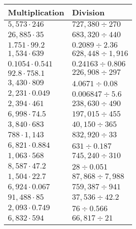 \begin{longtable}[]{@{}ll@{}}
\toprule
Multiplication & Division\tabularnewline
\midrule
\endhead
\(5,573\cdot246\) & \(727,380÷270\)\tabularnewline
\(26,885\cdot35\) & \(683,320÷440\)\tabularnewline
\(1.751\cdot99.2\) & \(0.2089÷2.36\)\tabularnewline
\(1,534\cdot639\) & \(628,448÷1,916\)\tabularnewline
\(0.1054\cdot0.541\) & \(0.24163÷0.806\)\tabularnewline
\(92.8\cdot758.1\) & \(226,908÷297\)\tabularnewline
\(3,430\cdot809\) & \(4.0671÷0.08\)\tabularnewline
\(2,231\cdot0.049\) & \(0.006847÷5.6\)\tabularnewline
\(2,394\cdot461\) & \(238,630÷490\)\tabularnewline
\(6,998\cdot74.5\) & \(197,015÷455\)\tabularnewline
\(3,840\cdot683\) & \(40,150÷365\)\tabularnewline
\(788\cdot1,143\) & \(832,920÷33\)\tabularnewline
\(6,821\cdot0.884\) & \(631÷0.187\)\tabularnewline
\(1,063\cdot568\) & \(745,240÷310\)\tabularnewline
\(8,587\cdot47.2\) & \(28÷0.051\)\tabularnewline
\(1,504\cdot22.7\) & \(87,868÷7,988\)\tabularnewline
\(6,924\cdot0.067\) & \(759,387÷941\)\tabularnewline
\(91,488\cdot85\) & \(37,536÷42.2\)\tabularnewline
\(2,093\cdot0.749\) & \(76÷0.566\)\tabularnewline
\(6,832\cdot594\) & \(66,817÷21\)\tabularnewline
\bottomrule
\end{longtable}

